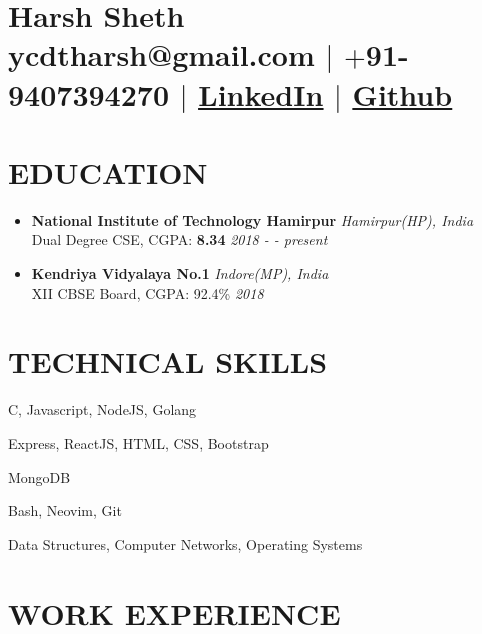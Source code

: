 \documentclass[12pt]{article}
\begin{document}
\section{\Huge{Harsh Sheth}\\ \large \normalfont ycdtharsh@gmail.com $|$ \normalfont $+$91-9407394270 $|$  \underline{\href{https://www.linkedin.com/in/harsh-sheth-2101}{LinkedIn}} $|$ \underline{\href{https://github.com/harsh-sheth}{Github}}}

\section{EDUCATION}
\begin{itemize}
  \item{
      \textbf{National Institute of Technology Hamirpur} \hfill \textit{Hamirpur(HP), India}\\
      Dual Degree CSE, CGPA: \textbf{8.34} \hfill \textit{2018 - - present}
  } 
  \item{
      \textbf{Kendriya Vidyalaya No.1} \hfill \textit{Indore(MP), India}\\
      XII CBSE Board, CGPA: 92.4\% \hfill \textit{2018}
  }
\end{itemize}

\section{TECHNICAL SKILLS}
\begin{description}
  \setlength{\itemindent}{\parindent}
  \setlength{\itemsep}{0em}
  \item[Languages:]{C, Javascript, NodeJS, Golang}
  \item[Web Technologies:]{Express, ReactJS, HTML, CSS, Bootstrap}
  \item[Database:]{MongoDB}
  \item[Tools:]{Bash, Neovim, Git}
  \item[Coursework:]{Data Structures, Computer Networks, Operating Systems}
\end{description}

\section{WORK EXPERIENCE}
\end{document}
